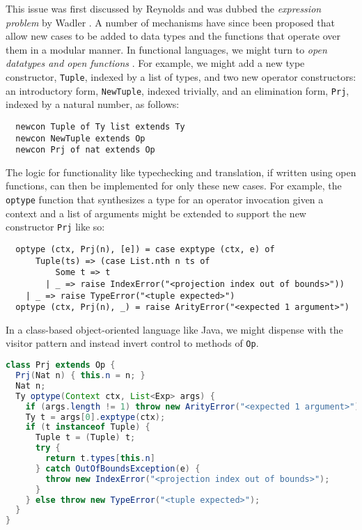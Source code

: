 This issue was first discussed by Reynolds \cite{Reynolds75} and was dubbed the \emph{expression problem} by Wadler \cite{wadler1998expression}. A number of mechanisms have since been proposed that allow new cases to be added to data types and the functions that operate over them in a modular manner. 
In functional languages, we might turn to \emph{open datatypes and open functions} \cite{conf/ppdp/LohH06, Millstein:2002:MTH:581478.581489}. For example, we might add a new type constructor, \verb|Tuple|, indexed by a list of types, and two new operator constructors: an introductory form, \verb|NewTuple|, indexed trivially, and an elimination form, \verb|Prj|, indexed by a natural number, as follows:
\begin{lstlisting}
  newcon Tuple of Ty list extends Ty
  newcon NewTuple extends Op
  newcon Prj of nat extends Op
\end{lstlisting}

The logic for functionality like typechecking and translation, if written using open functions, can then be implemented for only these new cases. For example, the \verb|optype| function that synthesizes a type for an operator invocation given a context and a list of arguments might be extended to support the new constructor \verb|Prj| like so:
\begin{lstlisting}
  optype (ctx, Prj(n), [e]) = case exptype (ctx, e) of 
      Tuple(ts) => (case List.nth n ts of 
          Some t => t
        | _ => raise IndexError("<projection index out of bounds>"))
    | _ => raise TypeError("<tuple expected>")
  optype (ctx, Prj(n), _) = raise ArityError("<expected 1 argument>")
\end{lstlisting}

In a class-based object-oriented language like Java, we might dispense with the visitor pattern and instead invert control to methods of \verb|Op|. 

\begin{lstlisting}[language=Java]
class Prj extends Op {
  Prj(Nat n) { this.n = n; }
  Nat n;
  Ty optype(Context ctx, List<Exp> args) {
    if (args.length != 1) throw new ArityError("<expected 1 argument>")
    Ty t = args[0].exptype(ctx);
    if (t instanceof Tuple) {
      Tuple t = (Tuple) t;
      try {
        return t.types[this.n]
      } catch OutOfBoundsException(e) {
        throw new IndexError("<projection index out of bounds>");
      }
    } else throw new TypeError("<tuple expected>");
  }
}
\end{lstlisting} 

